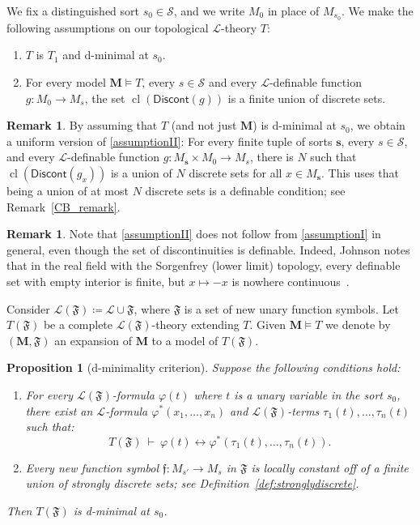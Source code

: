 \documentclass[11pt]{amsart}
\theoremstyle{plain}
\newtheorem{prop}[thm]{Proposition}
\theoremstyle{definition}
\newtheorem{remark}[thm]{Remark}
\numberwithin{equation}{section}
\newcommand{\fr}{\mathfrak}
\newcommand\calL{\mathcal{L}}
\newcommand\calS{\mathcal{S}}
\newcommand\0{\varnothing}
\begin{document}
\noindent
We fix a distinguished sort $s_0 \in \calS$, and we write $M_0$ in place of $M_{s_0}$. We make the following assumptions on our topological $\calL$-theory $T$:
\begin{enumerate}[label=(\Roman*)]
\item\label{assumptionI} $T$ is $T_1$ and d-minimal at $s_0$. \item\label{assumptionII} For every model $\bm{M} \models T$, every $s \in \calS$ and every $\calL$-definable function $g \colon M_0\to M_s$, the set $\operatorname{cl}(\mathsf{Discont}(g))$ is a finite union of discrete sets. 
\end{enumerate}

\begin{remark}
By assuming that $T$ (and not just $\bm{M}$) is d-minimal at $s_0$, we obtain a uniform version of \ref{assumptionII}: For every finite tuple of sorts $\bm{s}$, every $s \in \calS$, and every $\calL$-definable function $g\colon M_{\bm{s}}\times M_0\to M_s$, there is $N$ such that $\operatorname{cl}(\mathsf{Discont}(g_x))$ is a union of $N$ discrete sets for all $x \in M_{\bm{s}}$. This uses that being a union of at most $N$ discrete sets is a definable condition;
see Remark~\ref{CB_remark}.
\end{remark}


\begin{remark}
Note that \ref{assumptionII} does not follow from \ref{assumptionI} in general, even though the set of discontinuities is definable. Indeed, Johnson notes that in the real field with the Sorgenfrey (lower limit) topology, every definable set with empty interior is finite, but $x \mapsto -x$ is nowhere continuous~\cite[Remark 1.16]{Jo24}.
\end{remark}

\noindent
Consider $\calL(\fr{F})\coloneqq \calL\cup\fr{F}$, where $\fr{F}$ is a set of new unary function symbols. Let $T(\fr{F})$ be a complete $\calL(\fr{F})$-theory extending $T$. Given $\bm{M}\models T$ we denote by $(\bm{M},\fr{F})$ an expansion of $\bm{M}$ to a model of $T(\fr{F})$.

\begin{prop}[d-minimality criterion]\label{d-minimality_criterion_ms}
Suppose the following conditions hold:
\begin{enumerate}[label=(\Alph*)]
\item\label{conditionA} For every $\calL(\fr{F})$-formula $\varphi(t)$ where $t$ is a unary  variable in the sort $s_0$, there exist an $\calL$-formula $\varphi^*(x_1,\ldots,x_n)$ and $\calL(\fr{F})$-terms $\tau_1(t),\ldots,\tau_n(t)$ such that:
\[
T(\fr{F}) \ \vdash \ \varphi(t)\leftrightarrow \varphi^*(\tau_1(t),\ldots,\tau_n(t)).
\]
\item\label{conditionB} Every new function symbol $\fr{f}\colon M_{s'}\to M_{s}$ in $\fr{F}$ is locally constant off of a finite union of strongly discrete sets; see Definition~\ref{def:stronglydiscrete}.\end{enumerate}
Then $T(\fr{F})$ is d-minimal at $s_0$.
\end{prop}
\end{document}
